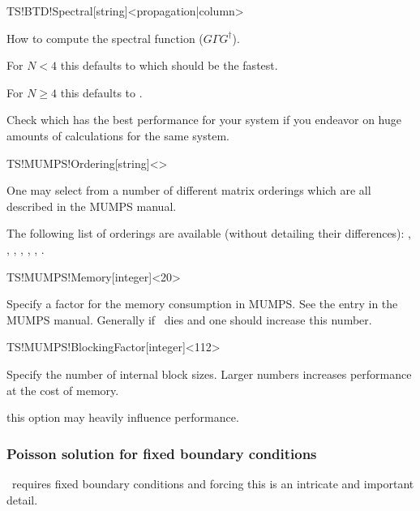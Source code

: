 \begin{fdfentry}{TS!BTD!Spectral}[string]<propagation|column>

  How to compute the spectral function ($G\Gamma G^\dagger$). 

  For $N<4$ this defaults to  which should be the
  fastest.

  For $N\ge4$ this defaults to .

  Check which has the best performance for your system if you endeavor
  on huge amounts of calculations for the same system.

\end{fdfentry}


\begin{fdfentry}{TS!MUMPS!Ordering}[string]<>

  One may select from a number of different matrix orderings which are
  all described in the MUMPS manual. 

  The following list of orderings are available (without detailing
  their differences): %
  , , , , ,
  , .
  
\end{fdfentry}

\begin{fdfentry}{TS!MUMPS!Memory}[integer]<20>

  Specify a factor for the memory consumption in MUMPS. See the
   entry in the MUMPS manual. Generally if \tsiesta\
  dies and  one should increase this number.
  
\end{fdfentry}

\begin{fdfentry}{TS!MUMPS!BlockingFactor}[integer]<112>

  Specify the number of internal block sizes. Larger numbers increases
  performance at the cost of memory.
  
  \note this option may heavily influence performance.

\end{fdfentry}

\subsubsection{Poisson solution for fixed boundary conditions}

\tsiesta\ requires fixed boundary conditions and forcing this is an
intricate and important detail. 

